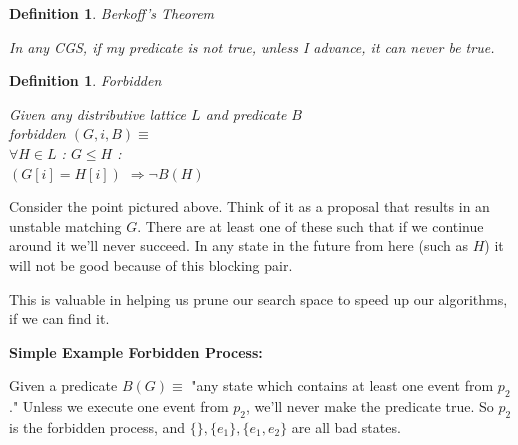 \documentclass[twoside]{article}
\newtheorem{definition}[theorem]{Definition}
\begin{document}
\begin{definition}
Berkoff's Theorem

In any CGS, if my predicate is not true, unless I advance, it can never be true.
\end{definition}

\begin{definition}
Forbidden

Given any distributive lattice $L$ and predicate $B$ \\
forbidden $(G, i, B) \equiv$ \\
$\forall H \in L$ : $G \leq H$ : \\
$(G[i] = H[i])$ $\Rightarrow \neg B(H)$

\end{definition}


Consider the point pictured above. Think of it as a proposal that results in an unstable matching $G$. There are at least one of these such that if we continue around it we'll never succeed. In any state in the future from here (such as $H$) it will not be good because of this blocking pair. 

This is valuable in helping us prune our search space to speed up our algorithms, if we can find it.

\textbf{Simple Example Forbidden Process:}


Given a predicate $B(G) \equiv$ "any state which contains at least one event from $p_2$." Unless we execute one event from $p_2$, we'll never make the predicate true. So $p_2$ is the forbidden process, and $\{ \}, \{e_1\}, \{e_1, e_2\}$ are all bad states.
\end{document}
